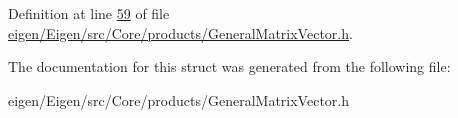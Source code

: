 Definition at line \hyperlink{eigen_2_eigen_2src_2_core_2products_2_general_matrix_vector_8h_source_l00059}{59} of file \hyperlink{eigen_2_eigen_2src_2_core_2products_2_general_matrix_vector_8h_source}{eigen/\+Eigen/src/\+Core/products/\+General\+Matrix\+Vector.\+h}.



The documentation for this struct was generated from the following file\+:\begin{DoxyCompactItemize}
\item 
eigen/\+Eigen/src/\+Core/products/\+General\+Matrix\+Vector.\+h\end{DoxyCompactItemize}
